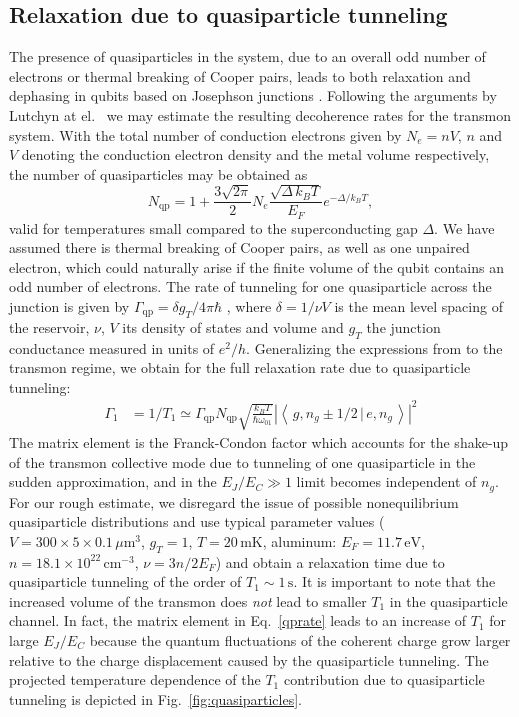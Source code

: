 \documentclass[twocolumn,amsmath,amssymb,floatfix,pra,showpacs,eqsecnum,footinbib,superscriptaddress]{revtex4}
\newcounter{fig}
\newcommand{\abs}[1]{\left|#1\right|}
\newcommand{\bket}[2]{\left\langle \, #1 \,|\, #2 \, \right\rangle}
\newcommand{\be}{\begin{equation}}
\newcommand{\ee}{\end{equation}}
\begin{document}
\subsection{Relaxation due to quasiparticle tunneling\label{sec:qprelax}}
The presence of quasiparticles in the system, due to an overall odd number of electrons or thermal breaking of Cooper pairs, leads to both relaxation and dephasing in qubits based on Josephson junctions \cite{lutchyn1,lutchyn2}. Following the arguments by Lutchyn at el.\ \cite{lutchyn2} we may estimate the resulting decoherence rates for the transmon system. With the total number of conduction electrons given by $N_e=n V$, $n$ and $V$ denoting the conduction electron density and the metal volume respectively, the number of quasiparticles may be obtained as
\be
N_\text{qp}=1+\frac{3\sqrt{2\pi}}{2}N_e \frac{\sqrt{\Delta\,k_BT}}{E_F} e^{-\Delta/k_BT},
\ee
valid for temperatures small compared to the superconducting gap $\Delta$. We have assumed there is thermal breaking of Cooper pairs, as well as one unpaired electron, which could naturally arise if the finite volume of the qubit contains an odd number of electrons. The rate of tunneling for one quasiparticle across the junction is given by $\Gamma_\text{qp}=\delta g_T/4\pi\hbar$ \cite{lutchyn2}, where $\delta=1/\nu V$ is the mean level spacing of the reservoir, $\nu$, $V$ its density of states and volume and $g_T$ the junction conductance measured in units of $e^2/h$. Generalizing the expressions from \cite{lutchyn2} to the transmon regime, we obtain for the full relaxation rate due to quasiparticle tunneling:
\begin{align}\label{qprate}
\Gamma_1&=1/T_1 \simeq \Gamma_\text{qp}N_\text{qp} \sqrt{\frac{k_B T}{\hbar\omega_{01}}}\abs{\bket{g,n_g\pm 1/2}{e,n_g}}^2
\end{align}
The matrix element is the Franck-Condon factor which accounts for the shake-up of the transmon collective mode due to tunneling of one quasiparticle in the sudden approximation, and in the $E_J/E_C\gg1$ limit becomes independent of $n_g$. For our rough estimate, we disregard the issue of possible nonequilibrium quasiparticle distributions and use typical parameter values ($V=300\times5\times0.1\,\mu\text{m}^3$, $g_T=1$, $T=20\,\text{mK}$, aluminum: $E_F=11.7\,\text{eV}$, $n=18.1\times10^{22}\,\text{cm}^{-3}$, $\nu=3n/2E_F$) and obtain a relaxation time due to quasiparticle tunneling of the order of $T_1\sim1\,\text{s}$. It is important to note that the increased volume of the transmon does \emph{not} lead to smaller $T_1$ in the quasiparticle channel. In fact, the matrix element in Eq.~\eqref{qprate} leads to an increase of $T_1$ for large $E_J/E_C$ because the quantum fluctuations of the coherent charge grow larger relative to the charge displacement caused by the quasiparticle tunneling. The projected temperature dependence of the $T_1$ contribution due to quasiparticle tunneling is depicted in Fig.~\ref{fig:quasiparticles}.
\end{document}
